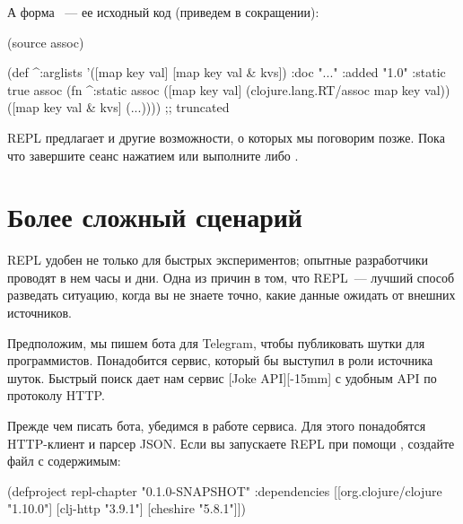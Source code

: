 А форма ~--- ее исходный код (приведем в сокращении):

\begin{english}
  \begin{clojure}
(source assoc)

(def
 ^{:arglists '([map key val] [map key val & kvs])
   :doc "..."
   :added "1.0"
   :static true}
 assoc
 (fn ^:static assoc
   ([map key val] (clojure.lang.RT/assoc map key val))
   ([map key val & kvs]
    (...)))) ;; truncated
  \end{clojure}
\end{english}

REPL предлагает и другие возможности, о которых мы поговорим позже. Пока что завершите сеанс нажатием  или выполните  либо .

\section{Более сложный сценарий}


REPL удобен не только для быстрых экспериментов; опытные разработчики проводят в нем часы и дни. Одна из причин в том, что REPL~--- лучший способ разведать ситуацию, когда вы не знаете точно, какие данные ожидать от внешних источников.

\def\urljokeapi{https://jokeapi.dev/}

Предположим, мы пишем бота для Telegram, чтобы публиковать шутки для программистов. Понадобится сервис, который бы выступил в роли источника шуток. Быстрый поиск дает нам сервис \footurl{Joke API}{\urljokeapi}[Joke API][-15mm] с удобным API по протоколу HTTP.

Прежде чем писать бота, убедимся в работе сервиса. Для этого понадобятся HTTP-клиент и парсер JSON. Если вы запускаете REPL при помощи , создайте файл  с содержимым:

\begin{english}
  \begin{clojure}
(defproject repl-chapter "0.1.0-SNAPSHOT"
  :dependencies [[org.clojure/clojure "1.10.0"]
                 [clj-http "3.9.1"]
                 [cheshire "5.8.1"]])
  \end{clojure}
\end{english}


